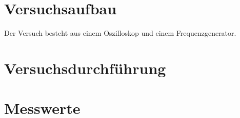 %

%
\section{Versuchsaufbau}
Der Versuch besteht aus einem Oszilloskop und einem Frequenzgenerator. 
\section{Versuchsdurchführung}

\section{Messwerte}

%

